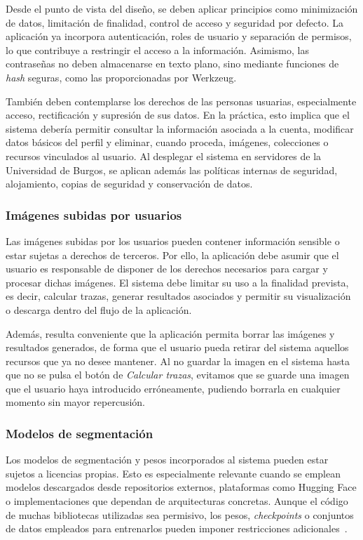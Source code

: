 Desde el punto de vista del diseño, se deben aplicar principios como minimización de datos, limitación de finalidad, control de acceso y seguridad por defecto. La aplicación ya incorpora autenticación, roles de usuario y separación de permisos, lo que contribuye a restringir el acceso a la información. Asimismo, las contraseñas no deben almacenarse en texto plano, sino mediante funciones de \textit{hash} seguras, como las proporcionadas por Werkzeug.

También deben contemplarse los derechos de las personas usuarias, especialmente acceso, rectificación y supresión de sus datos. En la práctica, esto implica que el sistema debería permitir consultar la información asociada a la cuenta, modificar datos básicos del perfil y eliminar, cuando proceda, imágenes, colecciones o recursos vinculados al usuario. Al desplegar el sistema en servidores de la Universidad de Burgos, se aplican además las políticas internas de seguridad, alojamiento, copias de seguridad y conservación de datos.

\subsubsection{Imágenes subidas por usuarios}

Las imágenes subidas por los usuarios pueden contener información sensible o estar sujetas a derechos de terceros. Por ello, la aplicación debe asumir que el usuario es responsable de disponer de los derechos necesarios para cargar y procesar dichas imágenes. El sistema debe limitar su uso a la finalidad prevista, es decir, calcular trazas, generar resultados asociados y permitir su visualización o descarga dentro del flujo de la aplicación.

Además, resulta conveniente que la aplicación permita borrar las imágenes y resultados generados, de forma que el usuario pueda retirar del sistema aquellos recursos que ya no desee mantener. Al no guardar la imagen en el sistema hasta que no se pulsa el botón de \textit{Calcular trazas}, evitamos que se guarde una imagen que el usuario haya introducido erróneamente, pudiendo borrarla en cualquier momento sin mayor repercusión.

\subsubsection{Modelos de segmentación}

Los modelos de segmentación y pesos incorporados al sistema pueden estar sujetos a licencias propias. Esto es especialmente relevante cuando se emplean modelos descargados desde repositorios externos, plataformas como Hugging Face o implementaciones que dependan de arquitecturas concretas. Aunque el código de muchas bibliotecas utilizadas sea permisivo, los pesos, \textit{checkpoints} o conjuntos de datos empleados para entrenarlos pueden imponer restricciones adicionales~\cite{huggingface_hub_license}.

